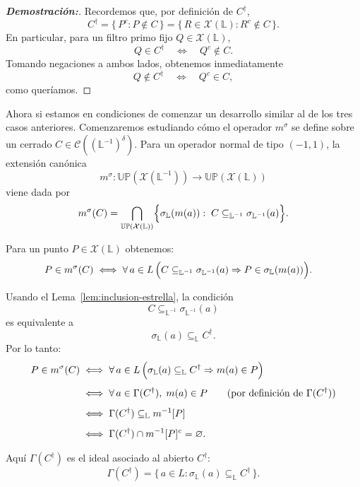\documentclass[12pt]{book}
\newcommand{\Up}{\mathbb{UP}}
\begin{document}
\begin{proof}[\textbf{Demostración:}]
Recordemos que, por definición de $C^{\dagger}$,
\[
C^{\dagger}
=
\{\,P^{c} : P\notin C\,\}
=
\{\,R\in\mathcal X(\mathbb L) : R^{c}\notin C\,\}.
\]
En particular, para un filtro primo fijo $Q\in\mathcal X(\mathbb L)$,
\[
Q\in C^{\dagger}
\quad\Longleftrightarrow\quad
Q^{c}\notin C.
\]
Tomando negaciones a ambos lados, obtenemos inmediatamente
\[
Q\notin C^{\dagger}
\quad\Longleftrightarrow\quad
Q^{c}\in C,
\]
como queríamos.
\end{proof}
Ahora si estamos en condiciones de comenzar un desarrollo similar al de los tres casos anteriores.
Comenzaremos estudiando cómo el operador $m^\sigma$ se define sobre un cerrado $C\in\mathcal{C}((\mathbb{L}^{-1})^\delta)$.  
Para un operador normal de tipo $(-1,1)$, la extensión canónica
\[
m^\sigma:\Up(\mathcal{X}(\mathbb{L}^{-1}))
\longrightarrow
\Up(\mathcal{X}(\mathbb{L}))
\]
viene dada por
\[
m^\sigma(C)
=
\bigcap_{\Up(\mathcal X(\mathbb L))}
\Bigl\{
\sigma_{\mathbb L}(m(a)) 
:\;
C\subseteq_{\mathbb L^{-1}}\sigma_{\mathbb L^{-1}}(a)
\Bigr\}.
\]

Para un punto $P\in\mathcal X(\mathbb L)$ obtenemos:
\begin{align*}
P\in m^\sigma(C)
&\;\Longleftrightarrow\;
\forall\,a\in L\,
\Bigl(
C\subseteq_{\mathbb L^{-1}}\sigma_{\mathbb L^{-1}}(a)
\Rightarrow
P\in\sigma_{\mathbb L}(m(a))
\Bigr).
\end{align*}

Usando el 
Lema~\ref{lem:inclusion-estrella}, la condición
\[
C\subseteq_{\mathbb L^{-1}}\sigma_{\mathbb L^{-1}}(a)
\]
es equivalente a
\[
\sigma_{\mathbb L}(a)\subseteq_{\mathbb L} C^{\dagger}.
\]
Por lo tanto:
\begin{align*}
P\in m^\sigma(C)
&\;\Longleftrightarrow\;
\forall\,a\in L\,
\Bigl(
\sigma_{\mathbb L}(a)\subseteq_{\mathbb L}C^{\dagger}
\Rightarrow
m(a)\in P
\Bigr)\\[0.4em]
&\;\Longleftrightarrow\;
\forall\,a\in\Gamma(C^{\dagger}),\; m(a)\in P
\qquad\text{(por definición de }\Gamma(C^{\dagger})\text{)}\\[0.4em]
&\;\Longleftrightarrow\;
\Gamma(C^{\dagger})
\subseteq_{\mathbb L} m^{-1}[P]\\[0.4em]
&\;\Longleftrightarrow\;
\Gamma(C^{\dagger})\cap m^{-1}[P]^{c}=\varnothing.
\end{align*}

Aquí $\Gamma(C^{\dagger})$ es el ideal asociado al abierto $C^{\dagger}$:
\[
\Gamma(C^{\dagger})
=\{\,a\in L : \sigma_{\mathbb L}(a)\subseteq_{\mathbb L} C^{\dagger}\,\}.
\]
\end{document}

